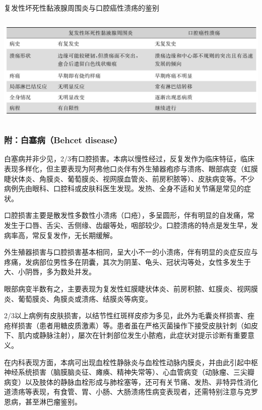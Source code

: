 \begin{table}[htbp]
\centering
\caption{复发性坏死性黏液腺周围炎与口腔癌性溃疡的鉴别}
\label{tab18-5}
\includegraphics[width=5.91667in,height=2.07292in]{./images/Image00118.jpg}
\end{table}

\subsubsection{附：白塞病（Behcet disease）}

白塞病并非少见，2/3有口腔损害。本病以慢性经过，反复发作为临床特征，临床表现多样化，但主要表现为阿弗他口炎伴有外生殖器疱疹与溃疡、眼部病变（虹膜睫状体炎、角膜炎、葡萄膜炎、视网膜血管炎、前房积脓等）、皮肤病变等。不少病例先由眼科、口腔科或皮肤科医生发现。发热、全身不适和关节痛是常见的症状。

口腔损害主要是散发性多数性小溃疡（口疮），多呈圆形，伴有明显的自发痛，常发生于口唇、舌尖、舌侧缘、齿龈等处，咽部较少。口腔溃疡的特点是发生早，发病率高，常反复发作，无长期缓解。

外生殖器损害与口腔损害基本相同，呈大小不一的小溃疡，伴有明显的炎症反应与疼痛，发病部位男性多在阴囊，其次为阴茎、龟头、冠状沟等处，女性多发生于大、小阴唇，多为数处并发。

眼部病变半数有之，主要表现为复发性虹膜睫状体炎、前房积脓、虹膜炎、视网膜炎、葡萄膜炎、角膜炎或溃疡、结膜炎等病变。

2/3以上病例有皮肤损害，以结节性红斑样皮疹为多见，此外为毛囊炎样损害、痤疮样损害（患者用糖皮质激素）等。患者虽在严格灭菌操作下接受皮肤针刺（如皮下、肌内或静脉注射），屡次在针刺部位发生小脓疱，此症状对提示诊断有重要意义。

在内科表现方面，本病可出现血栓性静脉炎与血栓性动脉内膜炎，并由此引起中枢神经系统损害（脑膜脑炎征、瘫痪、精神失常等）、心血管病变（动脉瘤、三尖瓣病变）以及肢体的静脉血栓形成与肺栓塞等，还可有关节痛、发热、非特异性消化道溃疡等表现，有食管、胃、小肠、大肠溃疡性病变表现者，还需特别注意与克罗恩病，甚至淋巴瘤鉴别。

